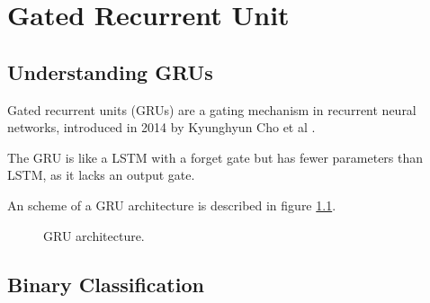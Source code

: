 
\chapter{Gated Recurrent Unit} %

\label{Chapter5} %


\section{Understanding GRUs}

Gated recurrent units (GRUs) are a gating mechanism in recurrent neural networks, introduced in 2014 by Kyunghyun Cho et al .

The GRU is like a LSTM with a forget gate but has fewer parameters than LSTM, as it lacks an output gate.

An scheme of a GRU architecture is described in figure \ref{fig:gru}.

\begin{figure}[H]
\begin{center}
\end{center}
\decoRule
\caption[GRU architecture]{GRU architecture.}
\label{fig:gru}
\end{figure}

\section{Binary Classification}


